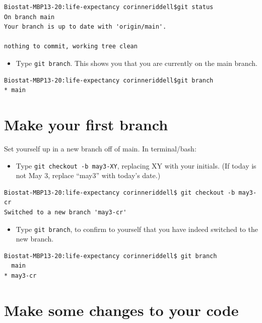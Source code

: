 \documentclass[
]{book}
\providecommand{\tightlist}{%
  \setlength{\itemsep}{0pt}\setlength{\parskip}{0pt}}
\begin{document}
\begin{verbatim}
Biostat-MBP13-20:life-expectancy corinneriddell$git status
On branch main
Your branch is up to date with 'origin/main'.

nothing to commit, working tree clean
\end{verbatim}

\begin{itemize}
\tightlist
\item
  Type \texttt{git\ branch}. This shows you that you are currently on the main branch.
\end{itemize}

\begin{verbatim}
Biostat-MBP13-20:life-expectancy corinneriddell$git branch
* main
\end{verbatim}

\hypertarget{make-your-first-branch}{%
\section{Make your first branch}\label{make-your-first-branch}}

Set yourself up in a new branch off of main. In terminal/bash:

\begin{itemize}
\tightlist
\item
  Type \texttt{git\ checkout\ -b\ may3-XY}, replacing XY with your initials. (If today
  is not May 3, replace ``may3'' with today's date.)
\end{itemize}

\begin{verbatim}
Biostat-MBP13-20:life-expectancy corinneriddell$ git checkout -b may3-cr
Switched to a new branch 'may3-cr'
\end{verbatim}

\begin{itemize}
\tightlist
\item
  Type \texttt{git\ branch}, to confirm to yourself that you have indeed switched to
  the new branch.
\end{itemize}

\begin{verbatim}
Biostat-MBP13-20:life-expectancy corinneriddell$ git branch
  main
* may3-cr
\end{verbatim}

\hypertarget{make-some-changes-to-your-code}{%
\section{Make some changes to your code}\label{make-some-changes-to-your-code}}
\end{document}
